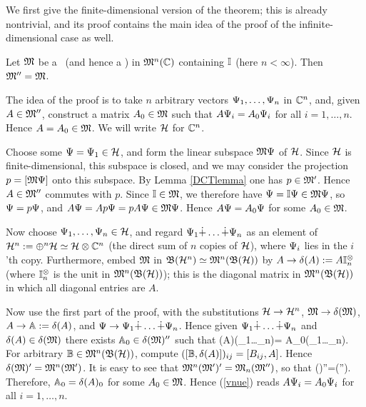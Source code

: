 We first give the finite-dimensional version of the theorem; this is
already nontrivial, and its proof contains the main idea of the proof
of the infinite-dimensional case as well.
\begin{Proposition}
Let ${\frak M}$ be a \sta\ (and hence a \ca) in ${\frak M}^n({\Bbb C})$ containing ${\Bbb I}$
(here $n<\infty$). Then ${\frak M}''={\frak M}$.
\end{Proposition}

The idea of the proof is to take $n$ arbitrary vectors
$\Psi_1,\ldots,\Psi_n$ in ${\Bbb C}^n$, and, given $A\in{\frak M}''$, construct a
matrix $A_0\in{\frak M}$ such that $A\Psi_i=A_0\Psi_i$ for all
$i=1,\ldots,n$. Hence $A=A_0\in{\frak M}$. We will write ${\cal H}$ for ${\Bbb C}^n$.

Choose some $\Psi=\Psi_1\in{\cal H}$, and form the linear subspace ${\frak M}\Psi$ of
${\cal H}$.  Since ${\cal H}$ is finite-dimensional, this subspace is closed, and
we may consider the projection $p=[{\frak M}\Psi]$ onto this subspace. By
Lemma \ref{DCTlemma} one has $p\in{\frak M}'$. Hence $A\in{\frak M}''$ commutes with
$p$. Since ${\Bbb I}\in{\frak M}$, we therefore have $\Psi={\Bbb I}\Psi\in{\frak M}\Psi$, so
$\Psi=p\Psi$, and $A\Psi=Ap\Psi= pA\Psi\in{\frak M}\Psi$. Hence $A\Psi=A_0\Psi$ for
some $A_0\in{\frak M}$.

Now choose $\Psi_1,\ldots,\Psi_n\in{\cal H}$, and regard
$\Psi_1\dot{+}\ldots\dot{+}\Psi_n$ as an element of
${\cal H}^n:=\oplus^n{\cal H}\simeq{\cal H}\otimes{\Bbb C}^n$ (the direct sum of $n$ copies of
${\cal H}$), where $\Psi_i$ lies in the $i$'th copy. Furthermore, embed ${\frak M}$
in ${\frak B}({\cal H}^n)\simeq {\frak M}^n({\frak B}({\cal H}))$ by $A\rightarrow\delta(A):=A{\Bbb I}_n^{\otimes}$ (where
${\Bbb I}_n^{\otimes}$ is the unit in ${\frak M}^n({\frak B}({\cal H}))$); this is the diagonal matrix
in ${\frak M}^n({\frak B}({\cal H}))$ in which all diagonal entries are $A$.

Now use the first part of the proof, with the substitutions ${\cal H}\rightarrow
{\cal H}^n$, ${\frak M}\rightarrow\delta({\frak M})$, $A\rightarrow\Bbb A:=\delta(A)$, and $\Psi\rightarrow
\Psi_1\dot{+}\ldots\dot{+}\Psi_n$.  Hence given
$\Psi_1\dot{+}\ldots\dot{+}\Psi_n$ and $\delta(A)\in\delta({\frak M})$ there exists
${\Bbb A}_0\in \delta({\frak M})''$ such that \be
\dl(A)(\Ps_1\dot{+}\ldots\dot{+}\Ps_n)={\Bbb
A}_0(\Ps_1\dot{+}\ldots\dot{+}\Ps_n).  \ee For arbitrary
$\Bbb B\in{\frak M}^n({\frak B}({\cal H}))$, compute $([\Bbb
B,\delta(A)])_{ij}=[B_{ij},A]$. Hence $\delta({\frak M})'={\frak M}^n({\frak M}')$. It is easy to
see that ${\frak M}^n({\frak M}')'={\frak M}_n({\frak M}'')$, so that \be \dl(\M)''=\dl(\M'').
\ee Therefore, ${\Bbb A}_0=\delta(A)_0$ for some $A_0\in{\frak M}$. Hence
(\ref{vnue}) reads $A\Psi_i=A_0\Psi_i$ for all $i=1,\ldots,n$.\enp

